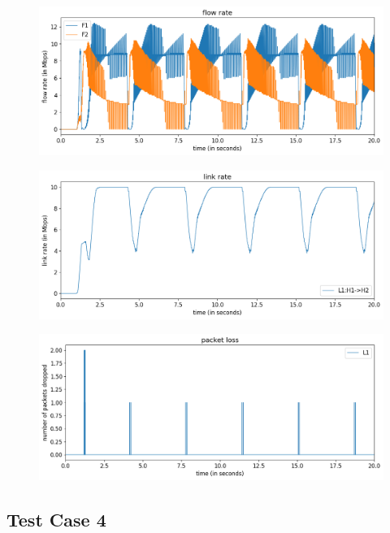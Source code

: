\documentclass{article}
\begin{document}
\begin{figure}[H]
\centering
\includegraphics[width = \textwidth]{test_case3 flow rate.png}
\end{figure}

\begin{figure}[H]
\centering
\includegraphics[width = \textwidth]{test_case3 link rate.png}
\end{figure}

\begin{figure}[H]
\centering
\includegraphics[width = \textwidth]{test_case3 packet loss.png}
\end{figure}


\subsection{Test Case 4}
\end{document}

